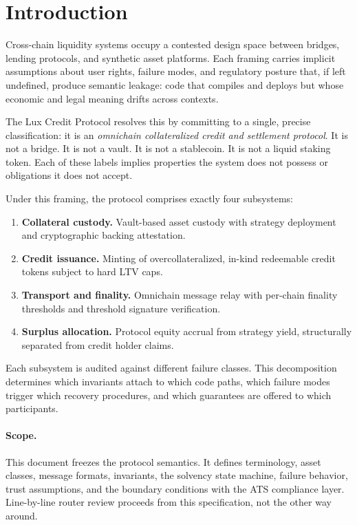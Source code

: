 \section{Introduction}

\label{sec:intro}

Cross-chain liquidity systems occupy a contested design space between bridges, lending protocols, and synthetic asset platforms. Each framing carries implicit assumptions about user rights, failure modes, and regulatory posture that, if left undefined, produce semantic leakage: code that compiles and deploys but whose economic and legal meaning drifts across contexts.

The Lux Credit Protocol resolves this by committing to a single, precise classification: it is an \emph{omnichain collateralized credit and settlement protocol}. It is not a bridge. It is not a vault. It is not a stablecoin. It is not a liquid staking token. Each of these labels implies properties the system does not possess or obligations it does not accept.

Under this framing, the protocol comprises exactly four subsystems:

\begin{enumerate}[nosep]
  \item \textbf{Collateral custody.} Vault-based asset custody with strategy deployment and cryptographic backing attestation.
  \item \textbf{Credit issuance.} Minting of overcollateralized, in-kind redeemable credit tokens subject to hard LTV caps.
  \item \textbf{Transport and finality.} Omnichain message relay with per-chain finality thresholds and threshold signature verification.
  \item \textbf{Surplus allocation.} Protocol equity accrual from strategy yield, structurally separated from credit holder claims.
\end{enumerate}

Each subsystem is audited against different failure classes. This decomposition determines which invariants attach to which code paths, which failure modes trigger which recovery procedures, and which guarantees are offered to which participants.

\paragraph{Scope.} This document freezes the protocol semantics. It defines terminology, asset classes, message formats, invariants, the solvency state machine, failure behavior, trust assumptions, and the boundary conditions with the ATS compliance layer. Line-by-line router review proceeds from this specification, not the other way around.


